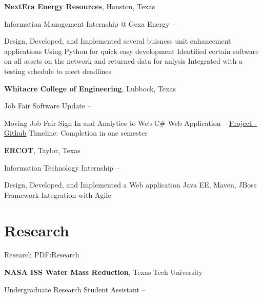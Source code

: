 \documentclass[a4paper,10pt,oneside]{article}
\begin{document}
\begin{body}
{\textbf{NextEra Energy Resources}},
Houston, Texas
\par
\Item
Information Management Internship @ Gexa Energy
\hfill
{} --
\begin{detail}
\BulletItem
Design, Developed, and Implemented several buisness unit enhancement applications
\BulletItem
Using Python for quick easy development
\BulletItem
Identified certain software on all assets on the network and returned data for anlysis
\BulletItem
Integrated with a testing schedule to meet deadlines
\end{detail}
\SmallEntryGap
\SmallEntryGap

{\textbf{Whitacre College of Engineering}},
Lubbock, Texas
\par
\Item
Job Fair Software Update
\hfill
{} --
\begin{detail}
\BulletItem
Moving Job Fair Sign In and Analytics to Web
\BulletItem
C\# Web Application -- \href{https://github.com/rahutchinson/COEJOBFAIR}{\underline{Project - Github}}
\BulletItem
Timeline: Completion in one semester
\end{detail}
\SmallEntryGap
\SmallEntryGap

{\textbf{ERCOT}},
Taylor, Texas
\par
\Item
Information Technology Internship
\hfill
{} --
\begin{detail}
\BulletItem
Design, Developed, and Implemented a Web application
\BulletItem
Java EE, Maven, JBoss Framework
\BulletItem
Integration with Agile
\end{detail}
\SmallEntryGap
\SmallEntryGap


\section{Research}
{Research}
{PDF:Research}

{\textbf{NASA ISS Water Mass Reduction}},
Texas Tech University
\par
\Item
Undergraduate Research Student Assistant
\hfill
{} --
\begin{detail}


\end{detail}
\end{body}
\end{document}
